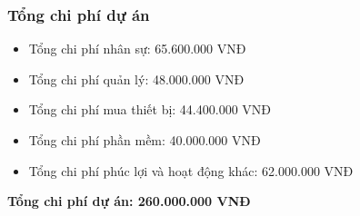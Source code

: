 \subsubsection{Tổng chi phí dự án}
\begin{itemize}
    \item Tổng chi phí nhân sự: 65.600.000 VNĐ
    \item Tổng chi phí quản lý: 48.000.000 VNĐ
    \item Tổng chi phí mua thiết bị: 44.400.000 VNĐ
    \item Tổng chi phí phần mềm: 40.000.000 VNĐ
    \item Tổng chi phí phúc lợi và hoạt động khác: 62.000.000 VNĐ
\end{itemize}
\textbf{Tổng chi phí dự án: 260.000.000 VNĐ}
